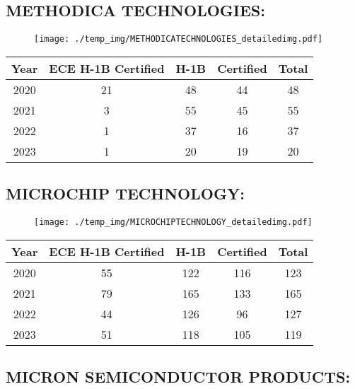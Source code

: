 \documentclass{article}%
\begin{document}
%
\newpage%
\subsection{METHODICA TECHNOLOGIES:}%
\label{subsec:METHODICATECHNOLOGIES}%
\label{METHODICATECHNOLOGIESdetailed}%


\begin{figure}[htbp]%
\centering%
\texttt{[image: ./temp\_img/METHODICATECHNOLOGIES\_detailedimg.pdf]}%
\end{figure}

%
\begin{longtable}{c|c|c|c|c}%
\hline%
Year&ECE H{-}1B Certified&H{-}1B&Certified&Total\\%
\hline%
2020&21&48&44&48\\%
\hline%
2021&3&55&45&55\\%
\hline%
2022&1&37&16&37\\%
\hline%
2023&1&20&19&20\\%
\hline%
\end{longtable}

%
\newpage%
\subsection{MICROCHIP TECHNOLOGY:}%
\label{subsec:MICROCHIPTECHNOLOGY}%
\label{MICROCHIPTECHNOLOGYdetailed}%


\begin{figure}[htbp]%
\centering%
\texttt{[image: ./temp\_img/MICROCHIPTECHNOLOGY\_detailedimg.pdf]}%
\end{figure}

%
\begin{longtable}{c|c|c|c|c}%
\hline%
Year&ECE H{-}1B Certified&H{-}1B&Certified&Total\\%
\hline%
2020&55&122&116&123\\%
\hline%
2021&79&165&133&165\\%
\hline%
2022&44&126&96&127\\%
\hline%
2023&51&118&105&119\\%
\hline%
\end{longtable}

%
\newpage%
\subsection{MICRON SEMICONDUCTOR PRODUCTS:}%
\label{subsec:MICRONSEMICONDUCTORPRODUCTS}%
\label{MICRONSEMICONDUCTORPRODUCTSdetailed}%
\end{document}
